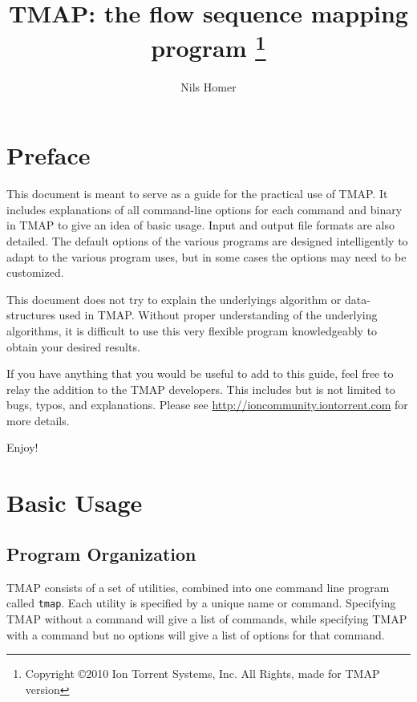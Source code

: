 \documentclass[a4paper,12pt]{book}
\author{Nils Homer}
\date{}
\title{TMAP: the flow sequence mapping program
\thanks{Copyright \copyright 2010 Ion Torrent Systems, Inc. All Rights, made for TMAP version \Version}
}
\newcommand{\TT}[1]{{\tt #1}} %
\begin{document}
\frontmatter

\maketitle

\tableofcontents
{}


\chapter{Preface}
This document is meant to serve as a guide for the practical use of TMAP.
It includes explanations of all command-line options for each command and binary in TMAP to give an idea of basic usage.
Input and output file formats are also detailed.
The default options of the various programs are designed intelligently to adapt to the various program uses, but in some cases the options may need to be customized.

This document does not try to explain the underlyings algorithm or data-structures used in TMAP.
Without proper understanding of the underlying algorithms, it is difficult to use this very flexible program knowledgeably to obtain your desired results.

If you have anything that you would be useful to add to this guide, feel free to relay the addition to the TMAP developers.
This includes but is not limited to bugs, typos, and explanations.
Please see \url{http://ioncommunity.iontorrent.com} for more details.

Enjoy!

\mainmatter

\chapter{Basic Usage}

\section{Program Organization}
TMAP consists of a set of utilities, combined into one command line program called \TT{tmap}.  
Each utility is specified by a unique name or command.
Specifying TMAP without a command will give a list of commands, while specifying TMAP with a command but no options will give a list of options for that command.
\end{document}
